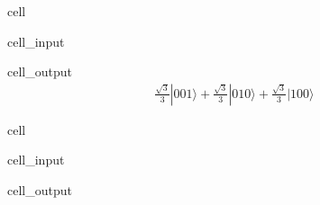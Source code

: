 \documentclass[letterpaper,10pt,english]{jupyterBook}
\begin{document}
\begin{sphinxuseclass}{cell}\begin{sphinxVerbatimInput}

\begin{sphinxuseclass}{cell_input}
\begin{sphinxVerbatim}[commandchars=\\\{\}]
   

\end{sphinxVerbatim}

\end{sphinxuseclass}\end{sphinxVerbatimInput}
\begin{sphinxVerbatimOutput}

\begin{sphinxuseclass}{cell_output}\begin{equation*}
\begin{split}\frac{\sqrt{3}}{3} |001\rangle+\frac{\sqrt{3}}{3} |010\rangle+\frac{\sqrt{3}}{3} |100\rangle\end{split}
\end{equation*}
\end{sphinxuseclass}\end{sphinxVerbatimOutput}

\end{sphinxuseclass}
\begin{sphinxuseclass}{cell}\begin{sphinxVerbatimInput}

\begin{sphinxuseclass}{cell_input}
\begin{sphinxVerbatim}[commandchars=\\\{\}]
\end{sphinxVerbatim}

\end{sphinxuseclass}\end{sphinxVerbatimInput}
\begin{sphinxVerbatimOutput}

\begin{sphinxuseclass}{cell_output}
\noindent{}

\end{sphinxuseclass}\end{sphinxVerbatimOutput}

\end{sphinxuseclass}
\sphinxstepscope
\end{document}
